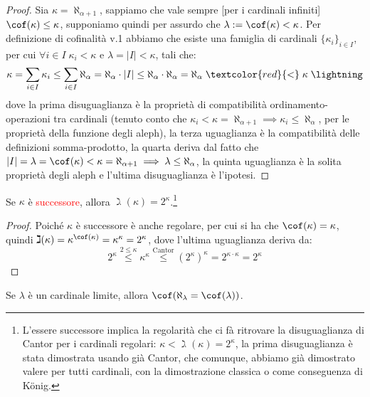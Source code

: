 \documentclass[11pt]{scrartcl}
\begin{document}
\begin{proof}
	Sia $\kappa = \aleph_{\alpha + 1}$, sappiamo che vale sempre [per i cardinali infiniti] $\cof(\kappa) \leq \kappa$, supponiamo quindi per assurdo che $\lambda := \cof(\kappa) < \kappa$.
	Per definizione di cofinalità v.1 abbiamo che esiste una famiglia di cardinali $\{\kappa_i\}_{i \in I}$, per cui $\forall i \in I \; \kappa_i < \kappa$ e $\lambda = |I| < \kappa$, tali che:
	\[ \kappa = \sum_{i \in I}\kappa_i \leq \sum_{i \in I} \aleph_\alpha = \aleph_\alpha \cdot |I| \leq \aleph_\alpha\cdot \aleph_\alpha = \aleph_\alpha \;\textcolor{red}{<}\; \kappa \; \lightning
		\]
	dove la prima disuguaglianza è la proprietà di compatibilità ordinamento-operazioni tra cardinali (tenuto conto che $\kappa_i < \kappa = \aleph_{\alpha + 1} \implies \kappa_i \leq \aleph_\alpha$, per le proprietà della funzione degli aleph), la terza uguaglianza è la compatibilità delle definizioni somma-prodotto,
	la quarta deriva dal fatto che $|I| = \lambda = \cof(\kappa) < \kappa = \aleph_{\alpha + 1} \implies \lambda \leq \aleph_\alpha$, la quinta uguaglianza è la solita proprietà degli aleph e l'ultima disuguaglianza è l'ipotesi.
\end{proof}

\begin{corollary}
	Se $\kappa$ è \textcolor{red}{successore}, allora $\gimel(\kappa) = 2^{\kappa}$.\footnote{L'essere successore implica la regolarità che ci fà ritrovare la disuguaglianza di Cantor per i cardinali regolari: $\kappa < \gimel(\kappa) = 2^{\kappa}$, la prima disuguaglianza
	è stata dimostrata usando già Cantor, che comunque, abbiamo già dimostrato valere per tutti cardinali, con la dimostrazione classica o come conseguenza di König.}
\end{corollary}

\begin{proof}
	Poiché $\kappa$ è successore è anche regolare, per cui si ha che $\cof(\kappa) = \kappa$, quindi $\gimel(\kappa) = \kappa^{\cof(\kappa)} = \kappa^\kappa = 2^{\kappa}$, dove l'ultima uguaglianza deriva da:
	\[ 2^{\kappa} \overset{2 \leq \kappa}{\leq} \kappa^\kappa \overset{\text{Cantor}}{\leq} (2^\kappa)^{\kappa} = 2^{\kappa \cdot \kappa} = 2^\kappa
		\]
\end{proof}

\begin{proposition}
	Se $\lambda$ è un cardinale limite, allora $\cof(\aleph_\lambda = \cof(\lambda))$.
\end{proposition}
\end{document}
